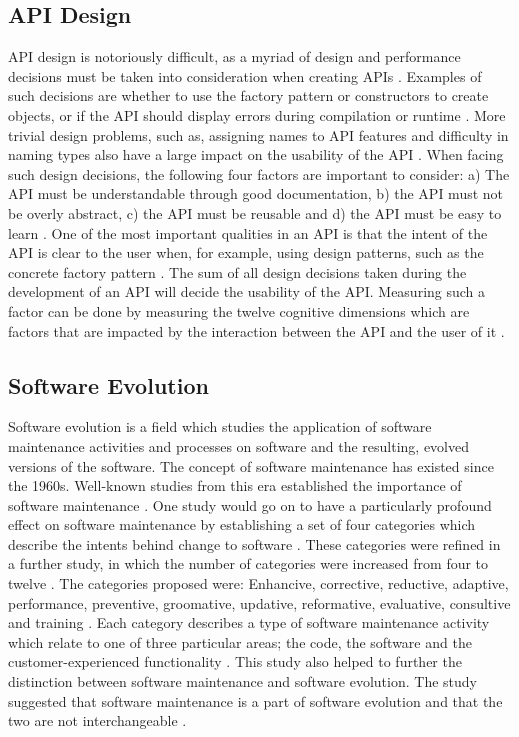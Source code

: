 \documentclass{sig-alternate}
\begin{document}
\subsection{API Design} \label{api_design}
API design is notoriously difficult, as a myriad of design and performance decisions must be taken into consideration when creating APIs \cite{afonso2012evaluating} \cite{bloch2008effective} \cite{stylos2006comparing}. Examples of such decisions are whether to use the factory pattern or constructors to create objects, or if the API should display errors during compilation or runtime \cite{stylos2006comparing}. More trivial design problems, such as, assigning names to API features and difficulty in naming types also have a large impact on the usability of the API \cite{shi2011empirical}. When facing such design decisions, the following four factors are important to consider: a) The API  must be understandable through good documentation, b) the API must not be overly abstract, c) the API must be reusable and d) the API must be easy to learn \cite{shi2011empirical}. One of the most important qualities in an API is that the intent of the API is clear to the user when, for example, using design patterns, such as the concrete factory pattern \cite{stylos2006comparing} \cite{shi2011empirical}. The sum of all design decisions taken during the development of an API will decide the usability of the API. Measuring such a factor can be done by measuring the twelve cognitive dimensions which are factors that are impacted by the interaction between the API and the user of it \cite{clarke2004measuring}. 


\subsection{Software Evolution} \label{software_evolution}
Software evolution is a field which studies the application of software maintenance activities and processes on software and the resulting, evolved versions of the software. The concept of software maintenance has existed since the 1960s. Well-known studies from this era established the importance of software maintenance \cite{lientz1980software}. One study would go on to have a particularly profound effect on software maintenance by establishing a set of four categories which describe the intents behind change to software \cite{lientz1980software}. These categories were refined in a further study, in which the number of categories were increased from four to twelve \cite{chapin2001types}. The categories proposed were: Enhancive, corrective, reductive, adaptive, performance, preventive, groomative, updative, reformative, evaluative, consultive and training \cite{chapin2001types}. Each category describes a type of software maintenance activity which relate to one of three particular areas; the code, the software and the customer-experienced functionality \cite{chapin2001types}. This study also helped to further the distinction between software maintenance and software evolution. The study suggested that software maintenance is a part of software evolution and that the two are not interchangeable \cite{chapin2001types}. 
\end{document}

